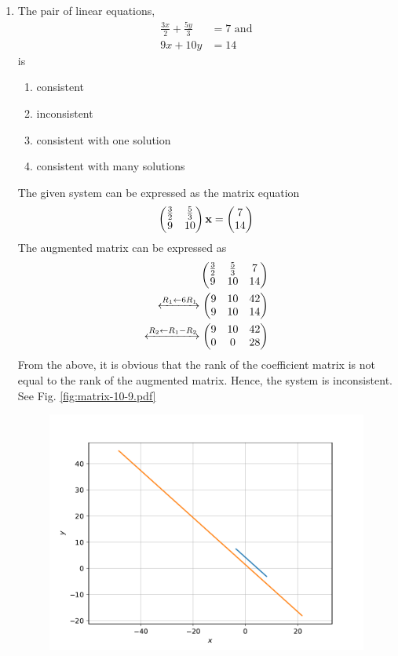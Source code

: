 \documentclass[journal,12pt,twocolumn]{IEEEtran}
\begin{document}
\begin{enumerate}
\item The pair of linear equations,
	\begin{align}
		\frac{3x}{2} + \frac{5y}{3} &=7  \text{ and}\\
		9x + 10y &= 14
	\end{align}
		is
\begin{enumerate}
\item consistent
\item inconsistent 
\item consistent with one solution
\item consistent with many solutions
\end{enumerate}
\solution  The given system can be expressed as the matrix equation
	\begin{align}
		\begin{pmatrix}\frac{3}{2} & \frac{5}{3} 
		\\
9 & 10 
		\end{pmatrix}\mathbf{x}=\begin{pmatrix}7  \\14\end{pmatrix}
	\end{align}
	The augmented matrix can be expressed as 
	\begin{align}
		\begin{pmatrix}\frac{3}{2} & \frac{5}{3} & 7
		\\
		9 & 10 & 14
		\end{pmatrix}
		\\
		\xleftrightarrow[]{R_1 \leftarrow 6R_1}
		\begin{pmatrix}9 & 10 & 42
		\\
		9 & 10 &14
		\end{pmatrix}
		\\
		\xleftrightarrow[]{R_2 \leftarrow R_1 - R_2}
		\begin{pmatrix}9 & 10 & 42
		\\
		0 & 0 & 28
		\end{pmatrix}
	\end{align}
From the above, it is obvious that the rank of the coefficient matrix is not equal to the rank of the augmented matrix.  Hence, the system is inconsistent.	
    See Fig. 
	  \ref{fig:matrix-10-9.pdf}
  \begin{figure}
	  \centering 
	  \includegraphics[width=\columnwidth]{figs/matrix-10-9.pdf}

\end{figure}
\end{enumerate}
\end{document}
